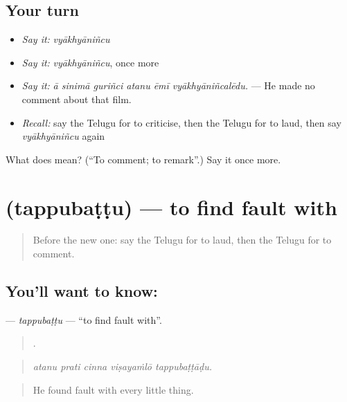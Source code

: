 \subsection*{Your turn}
\begin{itemize}
\raggedright
  \item \emph{Say it:} \emph{vyākhyāniñcu}
  \item \emph{Say it:} \emph{vyākhyāniñcu}, once more
  \item \emph{Say it:} \emph{ā sinimā guriñci atanu ēmī vyākhyāniñcalēdu.} — He made no comment about that film.
  \item \emph{Recall:} say the Telugu for to criticise, then the Telugu for to laud, then say \emph{vyākhyāniñcu} again
\end{itemize}

\begin{tcolorbox}[breakable,colback=teal!4,colframe=teal!35!black,title={Before you move on}]
What does  mean? (\textquotedblleft{}To comment; to remark\textquotedblright{}.) Say it once more.
\end{tcolorbox}
\section[\texorpdfstring{\te{తప్పుబట్టు} (tappubaṭṭu)}{తప్పుబట్టు (tappubaṭṭu)}]{ (tappubaṭṭu) — to find fault with}

\label{lesson:TE-C387-tappubattu}



\begin{quote}
Before the new one: say the Telugu for to laud, then the Telugu for to comment.
\end{quote}

\subsection*{You'll want to know: }
\textbf{} — \emph{tappubaṭṭu} — \textquotedblleft{}to find fault with\textquotedblright{}.

\begin{quote}
    .
\end{quote}

\begin{quote}
\emph{atanu prati cinna viṣayaṁlō tappubaṭṭāḍu.}
\end{quote}

\begin{quote}
He found fault with every little thing.
\end{quote}

